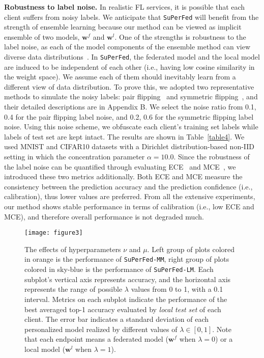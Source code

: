 \documentclass[sigconf]{acmart}
\begin{document}
\medskip 
\noindent\textbf{Robustness to label noise.} In realistic FL services, it is possible that each client suffers from noisy labels. We anticipate that \texttt{SuPerFed} will benefit from the strength of ensemble learning because our method can be viewed as implicit ensemble of two models, $\mathbf{w}^f$ and $\mathbf{w}^l$. One of the strengths is robustness to the label noise, as each of the model components of the ensemble method can view diverse data distributions~\cite{ensemblenoise,ensemblenoise2}. In \texttt{SuPerFed}, the federated model and the local model are induced to be independent of each other (i.e., having low cosine similarity in the weight space). We assume each of them should inevitably learn from a different view of data distribution. To prove this, we adopted two representative methods to simulate the noisy labels: pair flipping~\cite{pair} and symmetric flipping~\cite{symm}, and their detailed descriptions are in Appendix B. We select the noise ratio from {0.1, 0.4} for the pair flipping label noise, and {0.2, 0.6} for the symmetric flipping label noise. Using this noise scheme, we obfuscate each client's training set labels while labels of test set are kept intact. The results are shown in Table~\ref{table4}.
We used MNIST and CIFAR10 datasets with a Dirichlet distribution-based non-IID setting in which the concentration parameter $\alpha=10.0$. Since the robustness of the label noise can be quantified through evaluating ECE~\cite{ece} and MCE~\cite{mce}, we introduced these two metrics additionally. Both ECE and MCE measure the consistency between the prediction accuracy and the prediction confidence (i.e., calibration), thus lower values are preferred. From all the extensive experiments, our method shows stable performance in terms of calibration (i.e., low ECE and MCE), and therefore overall performance is not degraded much.
\vspace{-1.5mm}

\begin{figure*}[h]
\centering
\texttt{[image: figure3]}
\caption{The effects of hyperparameters $\nu$ and $\mu$. Left group of plots colored in orange is the performance of \texttt{SuPerFed-MM}, right group of plots colored in sky-blue is the performance of \texttt{SuPerFed-LM}. Each subplot's vertical axis represents accuracy, and the horizontal axis represents the range of possible $\lambda$ values from 0 to 1, with a 0.1 interval. Metrics on each subplot indicate the performance of the best averaged top-1 accuracy evaluated by \textit{local test set} of each client. The error bar indicates a standard deviation of each personalized model realized by different values of $\lambda\in[0,1]$. Note that each endpoint means a federated model ($\mathbf{w}^f$ when $\lambda=0$) or a local model ($\mathbf{w}^l$ when $\lambda=1$).}
\label{fig3}
\end{figure*}
\end{document}
